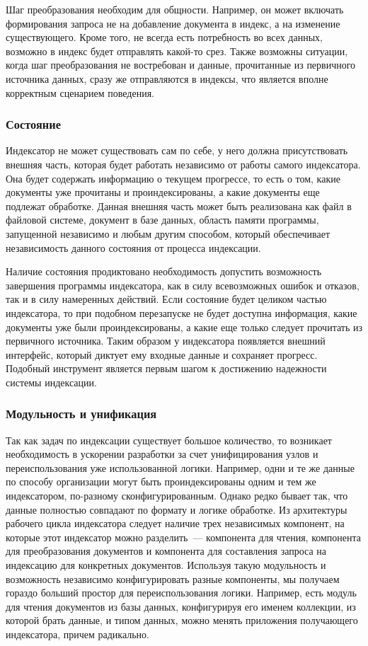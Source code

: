 Шаг преобразования необходим для общности. Например, он может включать формирования запроса не на добавление документа в индекс, а на изменение существующего. Кроме того, не всегда есть потребность во всех данных, возможно в индекс будет отправлять какой-то срез. Также возможны ситуации, когда шаг преобразования не востребован и данные, прочитанные из первичного источника данных, сразу же отправляются в индексы, что является вполне корректным сценарием поведения.

\subsubsection{Состояние}

Индексатор не может существовать сам по себе, у него должна присутствовать внешняя часть, которая будет работать независимо от работы самого индексатора. Она будет содержать информацию о текущем прогрессе, то есть о том, какие документы уже прочитаны и проиндексированы, а какие документы еще подлежат обработке. Данная внешняя часть может быть реализована как файл в файловой системе, документ в базе данных, область памяти программы, запущенной независимо и любым другим способом, который обеспечивает независимость данного состояния от процесса индексации.

Наличие состояния продиктовано необходимость допустить возможность завершения программы индексатора, как в силу всевозможных ошибок и отказов, так и в силу намеренных действий. Если состояние будет целиком частью индексатора, то при подобном перезапуске не будет доступна информация, какие документы уже были проиндексированы, а какие еще только следует прочитать из первичного источника. Таким образом у индексатора появляется внешний интерфейс, который диктует ему входные данные и сохраняет прогресс.  Подобный инструмент является первым шагом к достижению надежности системы индексации.

\subsubsection{Модульность и унификация}

Так как задач по индексации существует большое количество, то возникает необходимость в ускорении разработки за счет унифицирования узлов и переиспользования уже использованной логики. Например, одни и те же данные по способу организации могут быть проиндексированы одним и тем же индексатором, по-разному сконфигурированным. Однако редко бывает так, что данные полностью совпадают по формату и логике обработке. Из архитектуры рабочего цикла индексатора следует наличие трех независимых компонент, на которые этот индексатор можно разделить~--- компонента для чтения, компонента для преобразования документов и компонента для составления запроса на индексацию для конкретных документов. Используя такую модульность и возможность независимо конфигурировать разные компоненты, мы получаем гораздо больший простор для переиспользования логики. Например, есть модуль для чтения документов из базы данных, конфигурируя его именем коллекции, из которой брать данные, и типом данных, можно менять приложения получающего индексатора, причем радикально. 

